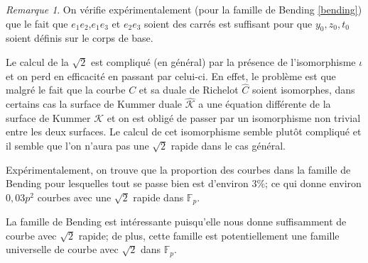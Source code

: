 \documentclass[a4paper]{article}
\newtheorem{lemme}[theoreme]{Lemme}
\newtheorem{corollaire}[theoreme]{Corollaire}
\theoremstyle{definition}
\theoremstyle{remark}
\newtheorem{remarque}{Remarque}
\numberwithin{equation}{section}
\begin{document}
%
%
%
%
%
\begin{remarque}
On vérifie expérimentalement (pour la famille de Bending \ref{bending}) que le fait que $e_1e_2$,$e_1e_3$ et $e_2e_3$ soient des carrés est suffisant pour que $y_0,z_0,t_0$ soient définis sur le corps de base.
\end{remarque}

Le calcul de la $\sqrt{2}$ est compliqué (en général) par la présence de l'isomorphisme $\iota$ et on perd en efficacité en passant par celui-ci.
En effet, le problème est que malgré le fait que la courbe $C$ et sa duale de Richelot $\hat{C}$ soient isomorphes, dans certains cas la surface de Kummer duale $\hat{\mathcal{K}}$ a une équation différente de la surface de Kummer $\mathcal{K}$ et on est obligé de passer par un isomorphisme non trivial entre les deux surfaces.
Le calcul de cet isomorphisme semble plutôt compliqué et il semble que l'on n'aura pas une $\sqrt{2}$ rapide dans le cas général.

Expérimentalement, on trouve que la proportion des courbes dans la famille de Bending pour lesquelles tout se passe bien est d'environ 3\%; ce qui donne environ $0,03p^2$ courbes avec une $\sqrt{2}$ rapide dans $\mathbb{F}_p$.

La famille de Bending est intéressante puisqu'elle nous donne suffisamment de courbe avec $\sqrt{2}$ rapide; de plus, cette famille est potentiellement une famille universelle de courbe avec $\sqrt{2}$ dans $\mathbb{F}_p$.
\end{document}
